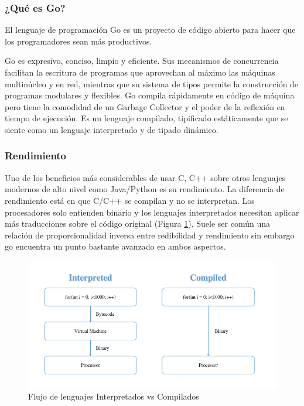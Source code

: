 \subsubsection{¿Qué es Go?}
El lenguaje de programación Go es un proyecto de código abierto para hacer que los programadores sean más productivos.

Go es expresivo, conciso, limpio y eficiente. Sus mecanismos de concurrencia facilitan la escritura de programas que aprovechan al máximo las máquinas multinúcleo y en red, mientras que su sistema de tipos permite la construcción de programas modulares y flexibles. Go compila rápidamente en código de máquina pero tiene la comodidad de un Garbage Collector y el poder de la reflexión en tiempo de ejecución. Es un lenguaje compilado, tipificado estáticamente que se siente como un lenguaje interpretado y de tipado dinámico.

\subsubsection{Rendimiento}
Uno de los beneficios más considerables de usar C, C++ sobre otros lenguajes modernos de alto nivel como Java/Python es su rendimiento. La diferencia de rendimiento está en que C/C++ se compilan y no se interpretan. Los procesadores solo entienden binario y los lenguajes interpretados necesitan aplicar más traducciones sobre el código original (Figura \ref{fig:5}). Suele ser común una relación de proporcionalidad inversa entre redibilidad y rendimiento sin embargo go encuentra un punto bastante avanzado en ambos aspectos.

\begin{figure}[h]
	\includegraphics[width=\linewidth]{Graphics/compiled_go.png}
	\caption{Flujo de lenguajes Interpretados vs Compilados}
	\label{fig:5}
\end{figure} 

